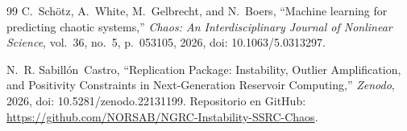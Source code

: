 \documentclass[aip,cha,reprint,amsmath,amssymb]{revtex4-2}
\begin{document}
\begin{thebibliography}{99}
C.~Sch{\"o}tz, A.~White, M.~Gelbrecht, and N.~Boers, ``Machine learning for predicting chaotic systems,'' \emph{Chaos: An Interdisciplinary Journal of Nonlinear Science}, vol.~36, no.~5, p.~053105, 2026, doi: 10.1063/5.0313297.

N.~R. Sabill{\'o}n~Castro, ``Replication Package: Instability, Outlier Amplification, and Positivity Constraints in Next-Generation Reservoir Computing,'' \emph{Zenodo}, 2026, doi: 10.5281/zenodo.22131199. Repositorio en GitHub: \url{https://github.com/NORSAB/NGRC-Instability-SSRC-Chaos}.

\end{thebibliography}
\end{document}
